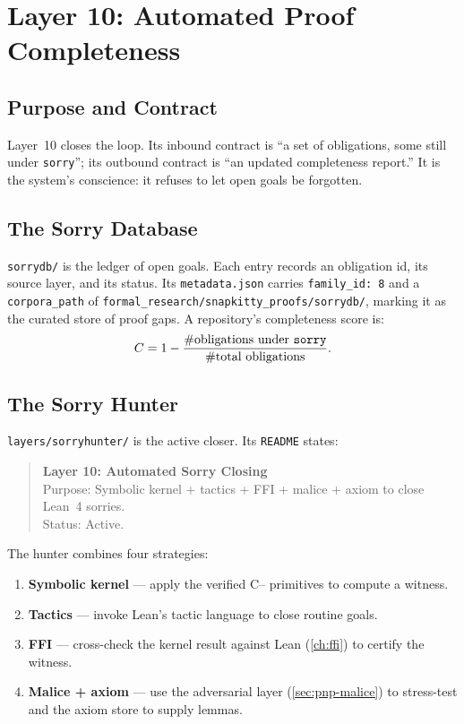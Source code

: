 \chapter{Layer 10: Automated Proof Completeness}
\label{ch:completeness}

\section{Purpose and Contract}
\label{sec:comp-purpose}

Layer~10 closes the loop. Its inbound contract is ``a set of obligations, some
still under \texttt{sorry}''; its outbound contract is ``an updated
completeness report.'' It is the system's conscience: it refuses to let open
goals be forgotten.

\section{The Sorry Database}
\label{sec:comp-sorrydb}

\texttt{sorrydb/} is the ledger of open goals. Each entry records an
obligation id, its source layer, and its status. Its \texttt{metadata.json}
carries \texttt{family\_id: 8} and a \texttt{corpora\_path} of
\texttt{formal\_research/snapkitty\_proofs/sorrydb/}, marking it as the
curated store of proof gaps. A repository's completeness score is:
\begin{equation}
C = 1 - \frac{\#\text{obligations under \texttt{sorry}}}{\#\text{total obligations}}.
\end{equation}

\section{The Sorry Hunter}
\label{sec:comp-hunter}

\texttt{layers/sorryhunter/} is the active closer. Its \texttt{README}
states:
\begin{quote}
\textbf{Layer 10: Automated Sorry Closing} \\
Purpose: Symbolic kernel + tactics + FFI + malice + axiom to close Lean~4
sorries. \\
Status: Active.
\end{quote}
The hunter combines four strategies:
\begin{enumerate}
  \item \textbf{Symbolic kernel} --- apply the verified C{--} primitives to
        compute a witness.
  \item \textbf{Tactics} --- invoke Lean's tactic language to close routine
        goals.
  \item \textbf{FFI} --- cross-check the kernel result against Lean
        (\cref{ch:ffi}) to certify the witness.
  \item \textbf{Malice + axiom} --- use the adversarial layer
        (\cref{sec:pnp-malice}) to stress-test and the axiom store to supply
        lemmas.
\end{enumerate}


